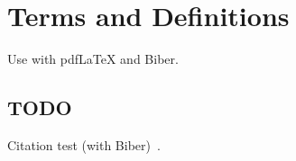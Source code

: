
\chapter{Terms and Definitions}\label{chapter:terms_and_definitions}
Use with pdfLaTeX and Biber.

\section{TODO}
Citation test (with Biber)~\parencite{latex}.








